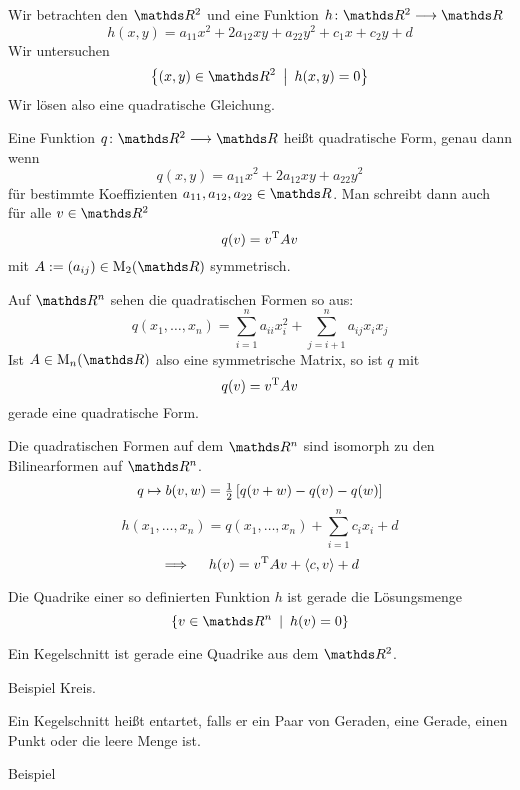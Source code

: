 		Wir betrachten den $\SR^2$ und eine Funktion $\func{h}{\SR^2}{\SR}$
		\[ h(x,y) = a_{11}x^2 + 2a_{12}xy + a_{22}y^2 + c_1x + c_2y + d \]
		Wir untersuchen
		\[ \set{(x,y)\in\SR^2}{ h(x,y)=0 } \]
		Wir lösen also eine quadratische Gleichung.

		\begin{definition}
			Eine Funktion $\func{q}{\SR^2}{\SR}$ heißt quadratische Form, genau dann wenn
			\[ q(x,y) = a_{11}x^2 + 2a_{12}xy + a_{22}y^2 \]
			für bestimmte Koeffizienten $a_{11},a_{12},a_{22}\in\SR$.
			Man schreibt dann auch für alle $v\in\SR^2$
			\[ q(v) = v^\mathrm{T} Av \]
			mit $A:= (a_{ij})\in\m{M}_2(\SR)$ symmetrisch.
		\end{definition}

		Auf $\SR^n$ sehen die quadratischen Formen so aus:
		\[ q(x_1,\ldots,x_n) = \sum_{i=1}^n a_{ii}x_i^2 + \sum_{j=i+1}^n a_{ij}x_ix_j \]
		Ist $A\in\m{M}_n(\SR)$ also eine symmetrische Matrix, so ist $q$ mit
		\[ q(v)=v^\mathrm{T} A v \]
		gerade eine quadratische Form.

		Die quadratischen Formen auf dem $\SR^n$ sind isomorph zu den Bilinearformen auf $\SR^n$.
		\[ q\mapsto b(v,w) = \tfrac{1}{2} \left[  q(v+w) - q(v) - q(w)  \right] \]
		\[ h(x_1,\ldots,x_n) = q(x_1,\ldots,x_n) + \sum_{i=1}^n c_ix_i + d \]
		\[ \implies \quad h(v) = v^\mathrm{T} A v  + \left\langle c,v \right\rangle + d \]

		\begin{definition}[Quadrike]
			Die Quadrike einer so definierten Funktion $h$ ist gerade die Lösungsmenge
			\[ \set{v\in\SR^n}{h(v)=0} \]
		\end{definition}

		\begin{definition}[Kegelschnitt]
			Ein Kegelschnitt ist gerade eine Quadrike aus dem $\SR^2$.
		\end{definition}

		Beispiel Kreis.

		\begin{definition}
			Ein Kegelschnitt heißt entartet, falls er ein Paar von Geraden, eine Gerade, einen Punkt oder die leere Menge ist.
		\end{definition}

		Beispiel

